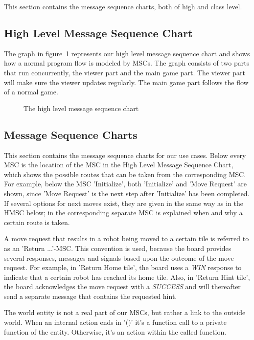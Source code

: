 This section contains the message sequence charts, both of high and class level.
\subsection{High Level Message Sequence Chart}
	The graph in figure~\ref{fig:msc:high} represents our high level message sequence chart and shows how a normal program flow is modeled by MSCs. The graph consists of two parts that run concurrently, the viewer part and the main game part. The viewer part will make sure the viewer updates regularly. The main game part follows the flow of a normal game.
	
	\begin{figure}[h]
		
		\label{fig:msc:high}
		\caption{The high level message sequence chart}
	\end{figure}

\subsection{Message Sequence Charts}
	This section contains the message sequence charts for our use cases. Below every MSC is the location of the MSC in the High Level Message Sequence Chart, which shows the possible routes that can be taken from the corresponding MSC. For example, below the MSC 'Initialize', both 'Initialize' and 'Move Request' are shown, since 'Move Request' is the next step after 'Initialize' has been completed. If several options for next moves exist, they are given in the same way as in the HMSC below; in the corresponding separate MSC is explained when and why a certain route is taken.

    A move request that results in a robot being moved to a certain tile is referred to as an 'Return ...'-MSC. This convention is used, because the board provides several responses, messages and signals based upon the outcome of the move request. For example, in 'Return Home tile', the board uses a \emph{WIN} response to indicate that a certain robot has reached its home tile. Also, in 'Return Hint tile', the board acknowledges the move request with a \emph{SUCCESS} and will thereafter send a separate message that contains the requested hint.

	The world entity is not a real part of our MSCs, but rather a link to the outside world. When an internal action ends in '()' it's a function call to a private function of the entity. Otherwise, it's an action within the called function.

